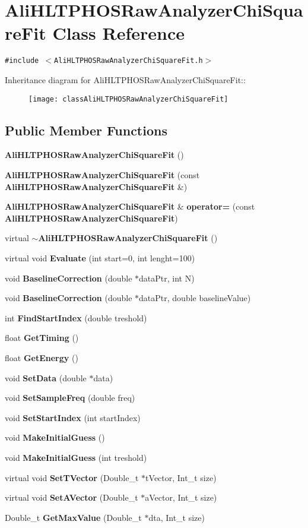 \section{Ali\-HLTPHOSRaw\-Analyzer\-Chi\-Square\-Fit Class Reference}
\label{classAliHLTPHOSRawAnalyzerChiSquareFit}
{\tt \#include $<$Ali\-HLTPHOSRaw\-Analyzer\-Chi\-Square\-Fit.h$>$}

Inheritance diagram for Ali\-HLTPHOSRaw\-Analyzer\-Chi\-Square\-Fit::\begin{figure}[H]
\begin{center}
\leavevmode
\texttt{[image: classAliHLTPHOSRawAnalyzerChiSquareFit]}
\end{center}
\end{figure}
\subsection*{Public Member Functions}
\begin{CompactItemize}
\item 
{\bf Ali\-HLTPHOSRaw\-Analyzer\-Chi\-Square\-Fit} ()
\item 
{\bf Ali\-HLTPHOSRaw\-Analyzer\-Chi\-Square\-Fit} (const {\bf Ali\-HLTPHOSRaw\-Analyzer\-Chi\-Square\-Fit} \&)
\item 
{\bf Ali\-HLTPHOSRaw\-Analyzer\-Chi\-Square\-Fit} \& {\bf operator=} (const {\bf Ali\-HLTPHOSRaw\-Analyzer\-Chi\-Square\-Fit})
\item 
virtual {\bf $\sim$Ali\-HLTPHOSRaw\-Analyzer\-Chi\-Square\-Fit} ()
\item 
virtual void {\bf Evaluate} (int start=0, int lenght=100)
\item 
void {\bf Baseline\-Correction} (double $\ast$data\-Ptr, int N)
\item 
void {\bf Baseline\-Correction} (double $\ast$data\-Ptr, double baseline\-Value)
\item 
int {\bf Find\-Start\-Index} (double treshold)
\item 
float {\bf Get\-Timing} ()
\item 
float {\bf Get\-Energy} ()
\item 
void {\bf Set\-Data} (double $\ast$data)
\item 
void {\bf Set\-Sample\-Freq} (double freq)
\item 
void {\bf Set\-Start\-Index} (int start\-Index)
\item 
void {\bf Make\-Initial\-Guess} ()
\item 
void {\bf Make\-Initial\-Guess} (int treshold)
\item 
virtual void {\bf Set\-TVector} (Double\_\-t $\ast$t\-Vector, Int\_\-t size)
\item 
virtual void {\bf Set\-AVector} (Double\_\-t $\ast$a\-Vector, Int\_\-t size)
\item 
Double\_\-t {\bf Get\-Max\-Value} (Double\_\-t $\ast$dta, Int\_\-t size)
\end{CompactItemize}
